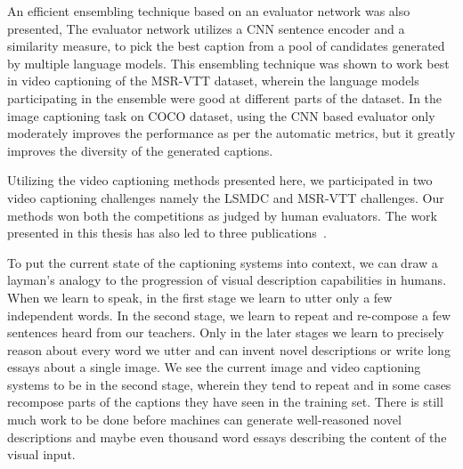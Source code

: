 An efficient ensembling technique based on an evaluator network was also
presented,
The evaluator network utilizes a CNN sentence encoder and a similarity measure,
to pick the best caption from a pool of candidates generated by multiple
language models.
This ensembling technique was shown to work best in video captioning of the
MSR-VTT dataset, wherein the language models participating in the ensemble were
good at different parts of the dataset.
In the image captioning task on COCO dataset, using the CNN based evaluator only
moderately improves the performance as per the automatic metrics, but it greatly
improves the diversity of the generated captions.

Utilizing the video captioning methods presented here, we participated in two
video captioning challenges namely the LSMDC and MSR-VTT challenges.
Our methods won both the competitions as judged by human evaluators.
The work presented in this thesis has also led to three
publications~\cite{shetty2015video,ShettyACMMM2016Wrk,ShettyACMMM2016}.

To put the current state of the captioning systems into context, we can draw a
layman's analogy to the progression of visual description capabilities in
humans.
When we learn to speak, in the first stage we learn to utter only a few
independent words.
In the second stage, we learn to repeat and re-compose a few sentences heard from
our teachers.
Only in the later stages we learn to precisely reason about every word we utter
and can invent novel descriptions or write long essays about a single image. 
We see the current image and video captioning systems to be in the second stage,
wherein they tend to repeat and in some cases recompose parts of the captions
they have seen in the training set.
There is still much work to be done before machines can generate well-reasoned
novel descriptions and maybe even thousand word essays describing the content
of the visual input.

